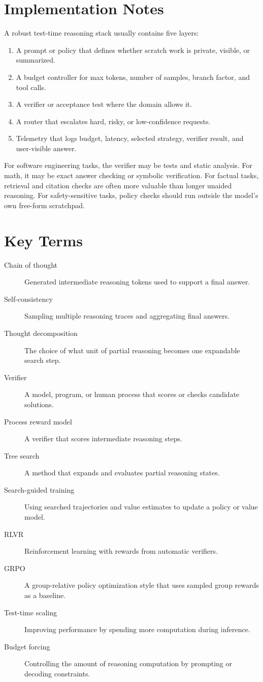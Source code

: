 \section{Implementation Notes}
A robust test-time reasoning stack usually contains five layers:
\begin{enumerate}
    \item A prompt or policy that defines whether scratch work is private, visible, or summarized.
    \item A budget controller for max tokens, number of samples, branch factor, and tool calls.
    \item A verifier or acceptance test where the domain allows it.
    \item A router that escalates hard, risky, or low-confidence requests.
    \item Telemetry that logs budget, latency, selected strategy, verifier result, and user-visible answer.
\end{enumerate}
For software engineering tasks, the verifier may be tests and static analysis. For math, it may be exact answer checking or symbolic verification. For factual tasks, retrieval and citation checks are often more valuable than longer unaided reasoning. For safety-sensitive tasks, policy checks should run outside the model's own free-form scratchpad.

\section{Key Terms}
\begin{description}
    \item[Chain of thought] Generated intermediate reasoning tokens used to support a final answer.
    \item[Self-consistency] Sampling multiple reasoning traces and aggregating final answers.
    \item[Thought decomposition] The choice of what unit of partial reasoning becomes one expandable search step.
    \item[Verifier] A model, program, or human process that scores or checks candidate solutions.
    \item[Process reward model] A verifier that scores intermediate reasoning steps.
    \item[Tree search] A method that expands and evaluates partial reasoning states.
    \item[Search-guided training] Using searched trajectories and value estimates to update a policy or value model.
    \item[RLVR] Reinforcement learning with rewards from automatic verifiers.
    \item[GRPO] A group-relative policy optimization style that uses sampled group rewards as a baseline.
    \item[Test-time scaling] Improving performance by spending more computation during inference.
    \item[Budget forcing] Controlling the amount of reasoning computation by prompting or decoding constraints.
\end{description}

